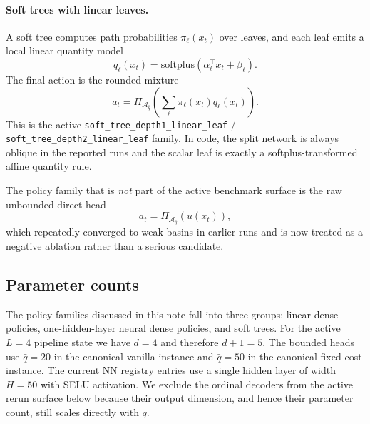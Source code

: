\documentclass[11pt]{article}
\begin{document}
\paragraph{Soft trees with linear leaves.}
A soft tree computes path probabilities $\pi_\ell(x_t)$ over leaves, and each leaf emits a local
linear quantity model
\[
q_\ell(x_t) = \mathrm{softplus}(\alpha_\ell^\top x_t + \beta_\ell).
\]
The final action is the rounded mixture
\[
a_t = \Pi_{\mathcal{A}_{\bar q}}\!\left(\sum_\ell \pi_\ell(x_t) q_\ell(x_t)\right).
\]
This is the active \texttt{soft\_tree\_depth1\_linear\_leaf} /
\texttt{soft\_tree\_depth2\_linear\_leaf} family. In code, the split network is always oblique in
the reported runs and the scalar leaf is exactly a softplus-transformed affine quantity rule.

The policy family that is \emph{not} part of the active benchmark surface is the raw unbounded
direct head
\[
a_t = \Pi_{\mathcal{A}_{\bar q}}\!\left(u(x_t)\right),
\]
which repeatedly converged to weak basins in earlier runs and is now treated as a negative ablation
rather than a serious candidate.

\subsection{Parameter counts}

The policy families discussed in this note fall into three groups: linear dense policies,
one-hidden-layer neural dense policies, and soft trees. For the active $L=4$ pipeline state we
have $d=4$ and therefore $d+1=5$. The bounded heads use $\bar q=20$ in the canonical vanilla
instance and $\bar q=50$ in the canonical fixed-cost instance. The current NN registry entries use
a single hidden layer of width $H=50$ with SELU activation. We exclude the ordinal decoders from
the active rerun surface below because their output dimension, and hence their parameter count,
still scales directly with $\bar q$.
\end{document}
